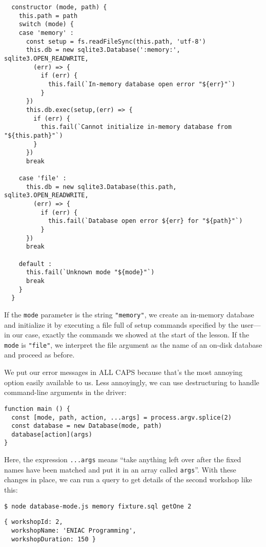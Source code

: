 \begin{verbatim}
  constructor (mode, path) {
    this.path = path
    switch (mode) {
    case 'memory' :
      const setup = fs.readFileSync(this.path, 'utf-8')
      this.db = new sqlite3.Database(':memory:', sqlite3.OPEN_READWRITE,
        (err) => {
          if (err) {
            this.fail(`In-memory database open error "${err}"`)
          }
      })
      this.db.exec(setup,(err) => {
        if (err) {
          this.fail(`Cannot initialize in-memory database from "${this.path}"`)
        }
      })
      break

    case 'file' :
      this.db = new sqlite3.Database(this.path, sqlite3.OPEN_READWRITE,
        (err) => {
          if (err) {
            this.fail(`Database open error ${err} for "${path}"`)
          }
      })
      break

    default :
      this.fail(`Unknown mode "${mode}"`)
      break
    }
  }
\end{verbatim}

If the \texttt{mode} parameter is the string \texttt{"memory"},
we create an in-memory database and initialize it by executing
a file full of setup commands specified by the user---in our case,
exactly the commands we showed at the start of the lesson.
If the \texttt{mode} is \texttt{"file"},
we interpret the file argument as the name of an on-disk database
and proceed as before.

We put our error messages in ALL CAPS because that's the most annoying option easily available to us.
Less annoyingly,
we can use destructuring to handle command-line arguments in the driver:

\begin{verbatim}
function main () {
  const [mode, path, action, ...args] = process.argv.splice(2)
  const database = new Database(mode, path)
  database[action](args)
}
\end{verbatim}

Here, the expression \texttt{...args} means
``take anything left over after the fixed names have been matched and put it in an array called \texttt{args}''.
With these changes in place,
we can run a query to get details of the second workshop like this:

\begin{verbatim}
$ node database-mode.js memory fixture.sql getOne 2
\end{verbatim}

\begin{verbatim}
{ workshopId: 2,
  workshopName: 'ENIAC Programming',
  workshopDuration: 150 }
\end{verbatim}

